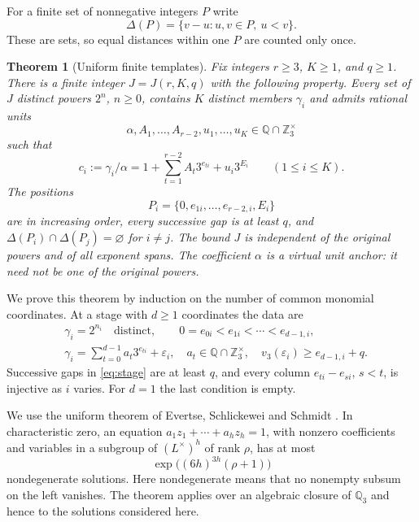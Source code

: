 \documentclass[11pt]{article}
\newtheorem{theorem}{Theorem}[section]
\theoremstyle{definition}
\theoremstyle{remark}
\newcommand{\Z}{\mathbb Z}
\newcommand{\Q}{\mathbb Q}
\newcommand{\val}{v_3}
\begin{document}
For a finite set of nonnegative integers $P$ write
\[
 \Delta(P)=\{v-u:u,v\in P,\ u<v\}.
\]
These are sets, so equal distances within one $P$ are counted only once.

\begin{theorem}[Uniform finite templates]\label{thm:templates}
Fix integers $r\ge3$, $K\ge1$, and $q\ge1$. There is a finite integer
$J=J(r,K,q)$ with the following property. Every set of $J$ distinct
powers $2^n$, $n\ge0$, contains $K$ distinct members $\gamma_i$ and
admits rational units
\[
 \alpha,A_1,\ldots,A_{r-2},u_1,\ldots,u_K
 \in\Q\cap\Z_3^\times
\]
such that
\begin{equation}\label{eq:template}
 c_i:=\gamma_i/\alpha
 =1+\sum_{t=1}^{r-2}A_t3^{e_{ti}}+u_i3^{E_i}
 \qquad(1\le i\le K).
\end{equation}
The positions
\[
 P_i=\{0,e_{1i},\ldots,e_{r-2,i},E_i\}
\]
are in increasing order, every successive gap is at least $q$, and
$\Delta(P_i)\cap\Delta(P_j)=\varnothing$ for $i\ne j$.
The bound $J$ is independent of the original powers and of all exponent
spans. The coefficient $\alpha$ is a virtual unit anchor: it need not
be one of the original powers.
\end{theorem}

We prove this theorem by induction on the number of common monomial
coordinates. At a stage with $d\ge1$ coordinates the data are
\begin{align}
 &\gamma_i=2^{n_i}\quad\text{distinct},\qquad
 0=e_{0i}<e_{1i}<\cdots<e_{d-1,i},\label{eq:stage}\\
 &\gamma_i=\sum_{t=0}^{d-1}a_t3^{e_{ti}}+\varepsilon_i,
 \quad a_t\in\Q\cap\Z_3^\times,
 \quad \val(\varepsilon_i)\ge e_{d-1,i}+q.\label{eq:error}
\end{align}
Successive gaps in \eqref{eq:stage} are at least $q$, and every column
$e_{ti}-e_{si}$, $s<t$, is injective as $i$ varies. For $d=1$ the last
condition is empty.

We use the uniform theorem of Evertse, Schlickewei and Schmidt
\cite[Theorem 1.1]{ESS}. In characteristic zero, an equation
$a_1z_1+\cdots+a_hz_h=1$, with nonzero coefficients and variables in a
subgroup of $(L^\times)^h$ of rank $\rho$, has at most
\[
 \exp\bigl((6h)^{3h}(\rho+1)\bigr)
\]
nondegenerate solutions. Here nondegenerate means that no nonempty
subsum on the left vanishes. The theorem applies over an algebraic
closure of $\Q_3$ and hence to the solutions considered here.
\end{document}
